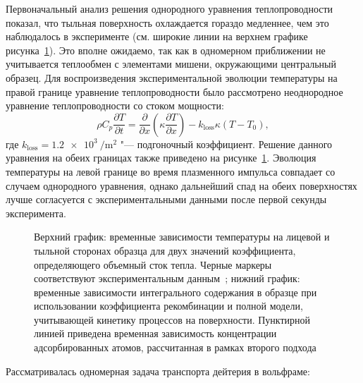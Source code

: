 Первоначальный анализ решения однородного уравнения теплопроводности показал, что тыльная поверхность охлаждается гораздо медленнее, чем это наблюдалось в эксперименте (см. широкие линии на верхнем графике рисунка~\cref{fig:ch3/QSPA_T_ret}). Это вполне ожидаемо, так как в одномерном приближении не учитывается теплообмен с элементами мишени, окружающими центральный образец. Для воспроизведения экспериментальной эволюции температуры на правой границе уравнение теплопроводности было рассмотрено неоднородное уравнение теплопроводности со стоком мощности:
\begin{equation}
	\label{eq:ch3/QSPA_heat_transfer}
	\rho C_p \frac{\partial T}{ \partial t} = \frac{\partial}{\partial x}\left( \kappa \frac{\partial T}{\partial x} \right)  - k_\mathrm{loss} \kappa \left( T-T_0 \right),
\end{equation}
где \( k_\mathrm{loss}=\SI{1.2e3}{\per\meter\squared} \) "--- подгоночный коэффициент. Решение данного уравнения на обеих границах также приведено на рисунке~\cref{fig:ch3/QSPA_T_ret}. Эволюция температуры на левой границе во время плазменного импульса совпадает со случаем однородного уравнения, однако дальнейший спад на обеих поверхностях лучше согласуется с экспериментальными данными после первой секунды эксперимента.

\begin{figure}[ht]
	\caption{Верхний график: временные зависимости температуры на лицевой и тыльной сторонах образца для двух значений коэффициента, определяющего объемный сток тепла. Черные маркеры соответствуют экспериментальным данным~\cite{Poskakalov2020}; нижний график: временные зависимости интегрального содержания в образце при использовании коэффициента рекомбинации и полной модели, учитывающей кинетику процессов на поверхности. Пунктирной линией приведена временная зависимость концентрации адсорбированных атомов, рассчитанная в рамках второго подхода }\label{fig:ch3/QSPA_T_ret}
\end{figure}

Рассматривалась одномерная задача транспорта дейтерия в вольфраме:

